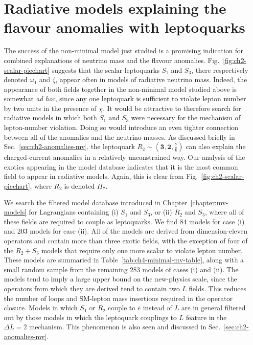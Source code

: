 \section{Radiative models explaining the flavour anomalies with leptoquarks}
\label{sec:ch4-rad-models-flav-anomalies}

The success of the non-minimal model just studied is a promising indication for
combined explanations of neutrino mass and the flavour anomalies.
Fig.~\ref{fig:ch2-scalar-piechart} suggests that the scalar leptoquarks $S_{1}$
and $S_3$, there respectively denoted $\omega_{1}$ and $\zeta$, appear often in
models of radiative neutrino mass. Indeed, the appearance of both fields
together in the non-minimal model studied above is somewhat \textit{ad hoc},
since any one leptoquark is sufficient to violate lepton number by two units in
the presence of $\chi$. It would be attractive to therefore search for radiative
models in which both $S_{1}$ and $S_{3}$ were necessary for the mechanism of
lepton-number violation. Doing so would introduce an even tighter connection
between all of the anomalies and the neutrino masses. As discussed briefly in
Sec.~\ref{sec:ch2-anomalies-mv}, the leptoquark
$R_{2} \sim (\mathbf{3}, \mathbf{2}, \tfrac{7}{6})$ can also explain the
charged-current anomalies in a relatively unconstrained way. Our analysis of the
exotics appearing in the model database indicates that it is the most common
field to appear in radiative models. Again, this is clear from
Fig.~\ref{fig:ch2-scalar-piechart}, where $R_{2}$ is denoted $\Pi_{7}$.

We search the filtered model database introduced in
Chapter~\ref{chapter:mv-models} for Lagrangians containing (i) $S_{1}$ and
$S_{3}$, or (ii) $R_{2}$ and $S_{3}$, where all of these fields are required to
couple as leptoquarks. We find 84 models for case (i) and 203 models for case
(ii). All of the models are derived from dimension-eleven operators and contain
more than three exotic fields, with the exception of four of the $R_{2} + S_{3}$
models that require only one more scalar to violate lepton number. These models
are summaried in Table~\ref{tab:ch4-minimal-mv-table}, along with a small random
sample from the remaining 283 models of cases (i) and (ii). The models tend to
imply a large upper bound on the new-physics scale, since the operators from
which they are derived tend to contain two $L$ fields. This reduces the number
of loops and SM-lepton mass insertions required in the operator closure. Models
in which $S_{1}$ or $R_{2}$ couple to $\bar{e}$ instead of $L$ are in general
filtered out by those models in which the leptoquark couplings to $L$ feature in
the $\Delta L = 2$ mechanism. This phenomenon is also seen and discussed in
Sec.~\ref{sec:ch2-anomalies-mv}.

